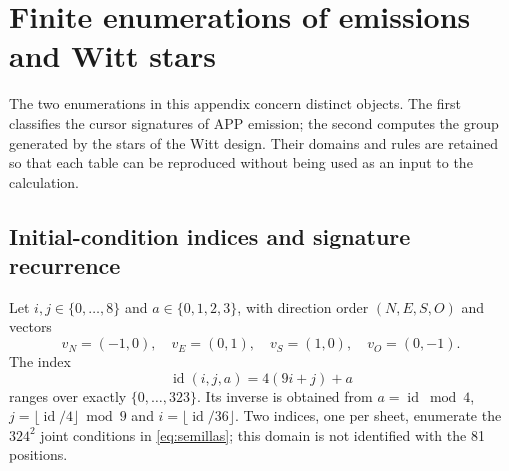 \section{Finite enumerations of emissions and Witt stars}
\label{iv:apendice-enumeraciones}

The two enumerations in this appendix concern distinct objects.
The first classifies the cursor signatures of APP emission;
the second computes the group generated by the stars of the Witt design.
Their domains and rules are retained so that each table can be reproduced
without being used as an input to the calculation.

\subsection{Initial-condition indices and signature recurrence}
\label{iv:apendice-firmas}

Let \(i,j\in\{0,\ldots,8\}\) and \(a\in\{0,1,2,3\}\), with
direction order \((N,E,S,O)\) and vectors
\[
 v_N=(-1,0),\quad v_E=(0,1),\quad
 v_S=(1,0),\quad v_O=(0,-1).
\]
The index
\[
 \operatorname{id}(i,j,a)=4(9i+j)+a
\]
ranges over exactly \(\{0,\ldots,323\}\). Its inverse is obtained
from \(a=\operatorname{id}\bmod4\),
\(j=\lfloor\operatorname{id}/4\rfloor\bmod9\) and
\(i=\lfloor\operatorname{id}/36\rfloor\).
Two indices, one per sheet, enumerate the \(324^2\) joint conditions
in \eqref{eq:semillas}; this domain is not identified with the 81 positions.

